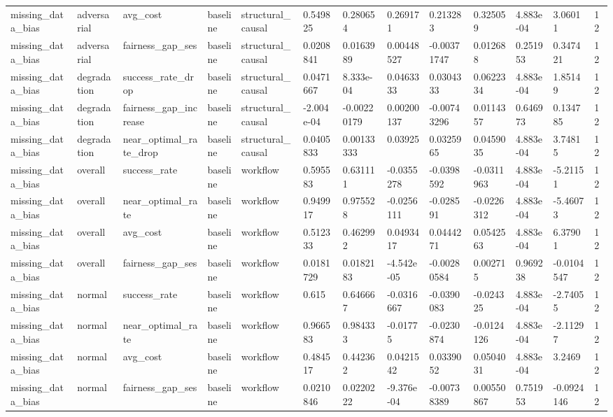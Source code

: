\begin{tabular}{lllllllllllll}
missing\_data\_bias & adversarial & avg\_cost & baseline & structural\_causal & 0.549825 & 0.280654 & 0.269171 & 0.213283 & 0.325059 & 4.883e-04 & 3.06011 & 12 \\
missing\_data\_bias & adversarial & fairness\_gap\_ses & baseline & structural\_causal & 0.0208841 & 0.0163989 & 0.00448527 & -0.00371747 & 0.012688 & 0.251953 & 0.347421 & 12 \\
missing\_data\_bias & degradation & success\_rate\_drop & baseline & structural\_causal & 0.0471667 & 8.333e-04 & 0.0463333 & 0.0304333 & 0.0622334 & 4.883e-04 & 1.85149 & 12 \\
missing\_data\_bias & degradation & fairness\_gap\_increase & baseline & structural\_causal & -2.004e-04 & -0.00220179 & 0.00200137 & -0.00743296 & 0.0114357 & 0.646973 & 0.134785 & 12 \\
missing\_data\_bias & degradation & near\_optimal\_rate\_drop & baseline & structural\_causal & 0.0405833 & 0.00133333 & 0.03925 & 0.0325965 & 0.0459035 & 4.883e-04 & 3.74815 & 12 \\
missing\_data\_bias & overall & success\_rate & baseline & workflow & 0.595583 & 0.631111 & -0.0355278 & -0.0398592 & -0.0311963 & 4.883e-04 & -5.21151 & 12 \\
missing\_data\_bias & overall & near\_optimal\_rate & baseline & workflow & 0.949917 & 0.975528 & -0.0256111 & -0.028591 & -0.0226312 & 4.883e-04 & -5.46073 & 12 \\
missing\_data\_bias & overall & avg\_cost & baseline & workflow & 0.512333 & 0.462992 & 0.0493417 & 0.0444271 & 0.0542563 & 4.883e-04 & 6.37901 & 12 \\
missing\_data\_bias & overall & fairness\_gap\_ses & baseline & workflow & 0.0181729 & 0.0182183 & -4.542e-05 & -0.00280584 & 0.002715 & 0.969238 & -0.0104547 & 12 \\
missing\_data\_bias & normal & success\_rate & baseline & workflow & 0.615 & 0.646667 & -0.0316667 & -0.0390083 & -0.024325 & 4.883e-04 & -2.74055 & 12 \\
missing\_data\_bias & normal & near\_optimal\_rate & baseline & workflow & 0.966583 & 0.984333 & -0.01775 & -0.0230874 & -0.0124126 & 4.883e-04 & -2.11297 & 12 \\
missing\_data\_bias & normal & avg\_cost & baseline & workflow & 0.484517 & 0.442362 & 0.0421542 & 0.0339052 & 0.0504031 & 4.883e-04 & 3.2469 & 12 \\
missing\_data\_bias & normal & fairness\_gap\_ses & baseline & workflow & 0.0210846 & 0.0220222 & -9.376e-04 & -0.00738389 & 0.00550867 & 0.751953 & -0.0924146 & 12 \\

\end{tabular}
